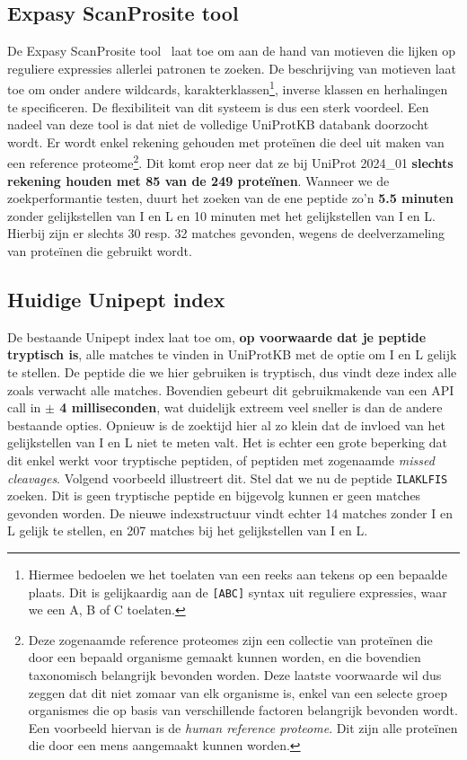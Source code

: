 \subsection{Expasy ScanProsite tool}
De Expasy ScanProsite tool~\cite{scanprosite} laat toe om aan de hand van motieven die lijken op reguliere expressies allerlei patronen te zoeken.
De beschrijving van motieven laat toe om onder andere wildcards, karakterklassen\footnote{Hiermee bedoelen we het toelaten van een reeks aan tekens op een bepaalde plaats. Dit is gelijkaardig aan de \texttt{[ABC]} syntax uit reguliere expressies, waar we een A, B of C toelaten.}, inverse klassen en herhalingen te specificeren.
De flexibiliteit van dit systeem is dus een sterk voordeel.
Een nadeel van deze tool is dat niet de volledige UniProtKB databank doorzocht wordt.
Er wordt enkel rekening gehouden met proteïnen die deel uit maken van een reference proteome\footnote{Deze zogenaamde reference proteomes zijn een collectie van proteïnen die door een bepaald organisme gemaakt kunnen worden, en die bovendien taxonomisch belangrijk bevonden worden. Deze laatste voorwaarde wil dus zeggen dat dit niet zomaar van elk organisme is, enkel van een selecte groep organismes die op basis van verschillende factoren belangrijk bevonden wordt. Een voorbeeld hiervan is de \textit{human reference proteome}. Dit zijn alle proteïnen die door een mens aangemaakt kunnen worden.}.
Dit komt erop neer dat ze bij UniProt 2024\_01 \textbf{slechts rekening houden met 85 van de 249 proteïnen}.
Wanneer we de zoekperformantie testen, duurt het zoeken van de ene peptide zo'n \textbf{5.5 minuten} zonder gelijkstellen van I en L en 10 minuten met het gelijkstellen van I en L\@.
Hierbij zijn er slechts 30 resp. 32 matches gevonden, wegens de deelverzameling van proteïnen die gebruikt wordt.

\subsection{Huidige Unipept index}
De bestaande Unipept index laat toe om, \textbf{op voorwaarde dat je peptide tryptisch is}, alle matches te vinden in UniProtKB met de optie om I en L gelijk te stellen.
De peptide die we hier gebruiken is tryptisch, dus vindt deze index alle zoals verwacht alle matches.
Bovendien gebeurt dit gebruikmakende van een API call in \textbf{$\pm$ 4 milliseconden}, wat duidelijk extreem veel sneller is dan de andere bestaande opties.
Opnieuw is de zoektijd hier al zo klein dat de invloed van het gelijkstellen van I en L niet te meten valt.
Het is echter een grote beperking dat dit enkel werkt voor tryptische peptiden, of peptiden met zogenaamde \textit{missed cleavages}.
Volgend voorbeeld illustreert dit.
Stel dat we nu de peptide \texttt{ILAKLFIS} zoeken.
Dit is geen tryptische peptide en bijgevolg kunnen er geen matches gevonden worden.
De nieuwe indexstructuur vindt echter 14 matches zonder I en L gelijk te stellen, en 207 matches bij het gelijkstellen van I en L\@.

